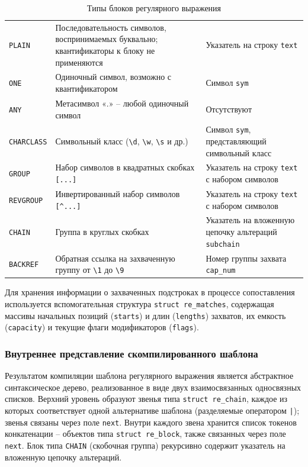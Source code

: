 \begin{xltabular}{\textwidth}{|C{3cm}|T|C{5cm}|}
	\caption{Типы блоков регулярного выражения}
	\label{tab:block_types} \\
	\hline
	 &  &  \\
	\hline
	\finishhead
	\verb`PLAIN` & Последовательность символов, воспринимаемых буквально;
	квантификаторы к блоку не применяются & Указатель на строку \verb`text` \\
	\hline
	\verb`ONE` & Одиночный символ, возможно с квантификатором &  Символ \verb`sym` \\
	\hline
	\verb`ANY` & Метасимвол «.» -- любой одиночный символ & Отсутствуют \\
	\hline
	\verb`CHARCLASS` & Символьный класс (\verb`\d`, \verb`\w`, \verb`\s` и др.) & Символ \verb`sym`, представляющий символьный класс \\
	\hline
	\verb`GROUP` & Набор символов в квадратных скобках \verb`[...]` & Указатель на строку \verb`text` с набором символов \\
	\hline
	\verb`REVGROUP` & Инвертированный набор символов \verb`[^...]` & Указатель на строку \verb`text` с набором символов \\
	\hline
	\verb`CHAIN` & Группа в круглых скобках & Указатель на вложенную цепочку альтераций \verb`subchain` \\
	\hline
	\verb`BACKREF` & Обратная ссылка на захваченную группу от \verb`\1` до \verb`\9` & Номер группы захвата \verb`cap_num` \\
	\hline
\end{xltabular}

Для хранения информации о захваченных подстроках в процессе сопоставления используется вспомогательная структура \verb`struct re_matches`, содержащая массивы начальных позиций (\verb`starts`) и длин (\verb`lengths`) захватов, их емкость (\verb`capacity`) и текущие флаги модификаторов (\verb`flags`).

\subsubsection{Внутреннее представление скомпилированного шаблона}

Результатом компиляции шаблона регулярного выражения является абстрактное синтаксическое дерево, реализованное в виде двух взаимосвязанных односвязных списков. Верхний уровень образуют звенья типа \verb`struct re_chain`, каждое из которых соответствует одной альтернативе шаблона (разделяемые оператором \verb`|`); звенья связаны через поле \verb`next`. Внутри каждого звена хранится список токенов конкатенации -- объектов типа \verb`struct re_block`, также связанных через поле \verb`next`. Блок типа \verb`CHAIN` (скобочная группа) рекурсивно содержит указатель на вложенную цепочку альтераций.

